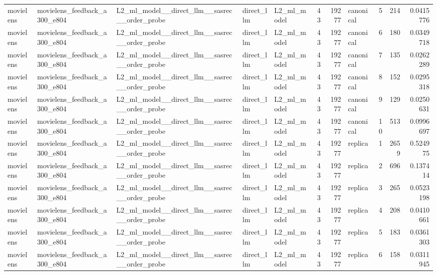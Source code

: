 \begin{table}[htbp!]
\begin{tabular}{lllllrrlrrr}
movielens & movielens\_feedback\_a300\_e804 & L2\_ml\_model\_\_direct\_llm\_\_sasrec\_\_order\_probe & direct\_llm & L2\_ml\_model & 43 & 19277 & canonical & 5 & 214 & 0.0415776 \\
movielens & movielens\_feedback\_a300\_e804 & L2\_ml\_model\_\_direct\_llm\_\_sasrec\_\_order\_probe & direct\_llm & L2\_ml\_model & 43 & 19277 & canonical & 6 & 180 & 0.0349718 \\
movielens & movielens\_feedback\_a300\_e804 & L2\_ml\_model\_\_direct\_llm\_\_sasrec\_\_order\_probe & direct\_llm & L2\_ml\_model & 43 & 19277 & canonical & 7 & 135 & 0.0262289 \\
movielens & movielens\_feedback\_a300\_e804 & L2\_ml\_model\_\_direct\_llm\_\_sasrec\_\_order\_probe & direct\_llm & L2\_ml\_model & 43 & 19277 & canonical & 8 & 152 & 0.0295318 \\
movielens & movielens\_feedback\_a300\_e804 & L2\_ml\_model\_\_direct\_llm\_\_sasrec\_\_order\_probe & direct\_llm & L2\_ml\_model & 43 & 19277 & canonical & 9 & 129 & 0.0250631 \\
movielens & movielens\_feedback\_a300\_e804 & L2\_ml\_model\_\_direct\_llm\_\_sasrec\_\_order\_probe & direct\_llm & L2\_ml\_model & 43 & 19277 & canonical & 10 & 513 & 0.0996697 \\
movielens & movielens\_feedback\_a300\_e804 & L2\_ml\_model\_\_direct\_llm\_\_sasrec\_\_order\_probe & direct\_llm & L2\_ml\_model & 43 & 19277 & replica & 1 & 2659 & 0.524975 \\
movielens & movielens\_feedback\_a300\_e804 & L2\_ml\_model\_\_direct\_llm\_\_sasrec\_\_order\_probe & direct\_llm & L2\_ml\_model & 43 & 19277 & replica & 2 & 696 & 0.137414 \\
movielens & movielens\_feedback\_a300\_e804 & L2\_ml\_model\_\_direct\_llm\_\_sasrec\_\_order\_probe & direct\_llm & L2\_ml\_model & 43 & 19277 & replica & 3 & 265 & 0.0523198 \\
movielens & movielens\_feedback\_a300\_e804 & L2\_ml\_model\_\_direct\_llm\_\_sasrec\_\_order\_probe & direct\_llm & L2\_ml\_model & 43 & 19277 & replica & 4 & 208 & 0.0410661 \\
movielens & movielens\_feedback\_a300\_e804 & L2\_ml\_model\_\_direct\_llm\_\_sasrec\_\_order\_probe & direct\_llm & L2\_ml\_model & 43 & 19277 & replica & 5 & 183 & 0.0361303 \\
movielens & movielens\_feedback\_a300\_e804 & L2\_ml\_model\_\_direct\_llm\_\_sasrec\_\_order\_probe & direct\_llm & L2\_ml\_model & 43 & 19277 & replica & 6 & 158 & 0.0311945 \\

\end{tabular}
\end{table}
